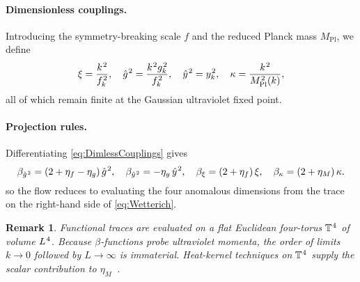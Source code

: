 \documentclass[pdflatex,sn-mathphys-num]{sn-jnl}
\theoremstyle{thmstyleone}
\theoremstyle{thmstyletwo}%
\newtheorem{remark}{Remark}%
\theoremstyle{thmstylethree}%
\newcommand{\sm}{\hspace{.065em}}
\newcommand{\smexp}[1]{^{\sm #1}}
\begin{document}
\paragraph{Dimensionless couplings.}
Introducing the symmetry-breaking scale $f$ and the reduced Planck mass
$M_{\mathrm{Pl}}$, we define
\begin{equation}
  \xi=\frac{k\smexp{2}}{f\smexp{2}_{k}},\quad
  \hat g\smexp{2}=\frac{k\smexp{2}g\smexp{2}_{k}}{f\smexp{2}_{k}},\quad
  \hat y\smexp{2}=y\smexp{2}_{k},\quad
  \kappa=\frac{k\smexp{2}}{M_{\mathrm{Pl}}\smexp{2}(k)},
  \label{eq:DimlessCouplings}
\end{equation}
all of which remain finite at the Gaussian ultraviolet fixed point.

\paragraph{Projection rules.}
Differentiating \eqref{eq:DimlessCouplings} gives
\begin{equation}
  \beta_{\hat g\smexp{2}}
   =(2+\eta_{f}-\eta_{g})\,\hat g\smexp{2},\quad
  \beta_{\hat y\smexp{2}}
   =-\eta_{y}\,\hat y\smexp{2},\quad
  \beta_{\xi}
   =(2+\eta_{f})\,\xi,\quad
  \beta_{\kappa}
   =(2+\eta_{M})\,\kappa.
  \label{eq:ProjRules}
\end{equation}
so the flow reduces to evaluating the four anomalous dimensions from
the trace on the right-hand side of \eqref{eq:Wetterich}.

\begin{remark}
Functional traces are evaluated on a flat Euclidean four-torus
$\mathbb T\smexp{4}$ of volume $L\smexp{4}$.  Because $\beta$-functions
probe ultraviolet momenta, the order of limits
\(k\to0\) followed by \(L\to\infty\) is immaterial.  Heat-kernel
techniques on $\mathbb T\smexp{4}$ supply the scalar contribution to
\(\eta_{M}\)~\cite{Vassilevich:2003}.
\end{remark}
\end{document}

